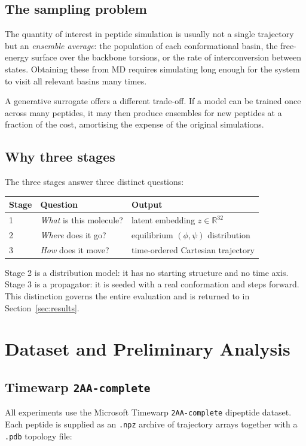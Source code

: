 \documentclass[11pt,a4paper]{article}
\newcommand{\phipsi}{$(\phi,\psi)$}
\begin{document}
\subsection{The sampling problem}
The quantity of interest in peptide simulation is usually not a single
trajectory but an \emph{ensemble average}: the population of each
conformational basin, the free-energy surface over the backbone torsions, or
the rate of interconversion between states. Obtaining these from MD requires
simulating long enough for the system to visit all relevant basins many times.

A generative surrogate offers a different trade-off. If a model can be trained
once across many peptides, it may then produce ensembles for new peptides at a
fraction of the cost, amortising the expense of the original simulations.

\subsection{Why three stages}
The three stages answer three distinct questions:

\begin{center}
\begin{tabular}{@{}lll@{}}
\toprule
Stage & Question & Output \\
\midrule
1 & \emph{What} is this molecule? & latent embedding $z \in \mathbb{R}^{32}$ \\
2 & \emph{Where} does it go?      & equilibrium \phipsi{} distribution \\
3 & \emph{How} does it move?      & time-ordered Cartesian trajectory \\
\bottomrule
\end{tabular}
\end{center}

Stage 2 is a distribution model: it has no starting structure and no time axis.
Stage 3 is a propagator: it is seeded with a real conformation and steps
forward. This distinction governs the entire evaluation and is returned to in
Section~\ref{sec:results}.

\section{Dataset and Preliminary Analysis}
\label{sec:data}

\subsection{Timewarp \texttt{2AA-complete}}
All experiments use the Microsoft Timewarp \texttt{2AA-complete} dipeptide
dataset. Each peptide is supplied as an \texttt{.npz} archive of trajectory
arrays together with a \texttt{.pdb} topology file:
\end{document}

